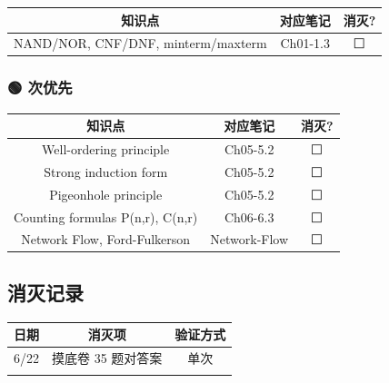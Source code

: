 \documentclass[10pt,a4paper,openany]{ctexbook}
\theoremstyle{definition}
\theoremstyle{remark}
\begin{document}
\begin{center}
\begin{tabular}{ccc}
\hline
知识点 & 对应笔记 & 消灭? \\ \hline
NAND/NOR, CNF/DNF, minterm/maxterm & Ch01-1.3 & ⬜ \\
\hline
\end{tabular}

\end{center}

\subsubsection{🟢 次优先}

\begin{center}
\begin{tabular}{ccc}
\hline
知识点 & 对应笔记 & 消灭? \\ \hline
Well-ordering principle & Ch05-5.2 & ⬜ \\
Strong induction form & Ch05-5.2 & ⬜ \\
Pigeonhole principle & Ch05-5.2 & ⬜ \\
Counting formulas P(n,r), C(n,r) & Ch06-6.3 & ⬜ \\
Network Flow, Ford-Fulkerson & Network-Flow & ⬜ \\
\hline
\end{tabular}

\end{center}

\vspace{-2pt}

\subsection{消灭记录}

\begin{center}
\begin{tabular}{ccc}
\hline
日期 & 消灭项 & 验证方式 \\ \hline
6/22 & 摸底卷 35 题对答案 & 单次 \\
 &  &  \\
\hline
\end{tabular}

\end{center}
\end{document}
